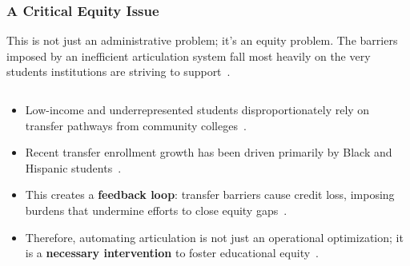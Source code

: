 \documentclass[aspectratio=169,10pt]{beamer}
\begin{document}
\begin{frame}
\begin{columns}[T]
\begin{column}{0.4\textwidth}
        \end{column}
    \end{columns}
    
    
\end{frame}

\begin{frame}
    \frametitle{A Critical Equity Issue}
    
    \begin{alertblock}{This is not just an administrative problem; it's an equity problem.}
        The barriers imposed by an inefficient articulation system fall most heavily on the very students institutions are striving to support~\cite{ace2025}.
    \end{alertblock}
    
    \begin{columns}[T]
        \begin{column}{0.6\textwidth}
            \begin{itemize}
                \item Low-income and underrepresented students disproportionately rely on transfer pathways from community colleges~\cite{ace2025}.
                
                \item Recent transfer enrollment growth has been driven primarily by Black and Hispanic students~\cite{nscnews2023}.
                
                \item This creates a \textbf{feedback loop}: transfer barriers cause credit loss, imposing burdens that undermine efforts to close equity gaps~\cite{ace2025,nscnews2023}.
                
                \item Therefore, automating articulation is not just an operational optimization; it is a \textbf{necessary intervention} to foster educational equity~\cite{collegeopportunity2017}.
            \end{itemize}
        \end{column}
    

\end{columns}
\end{frame}
\end{document}
